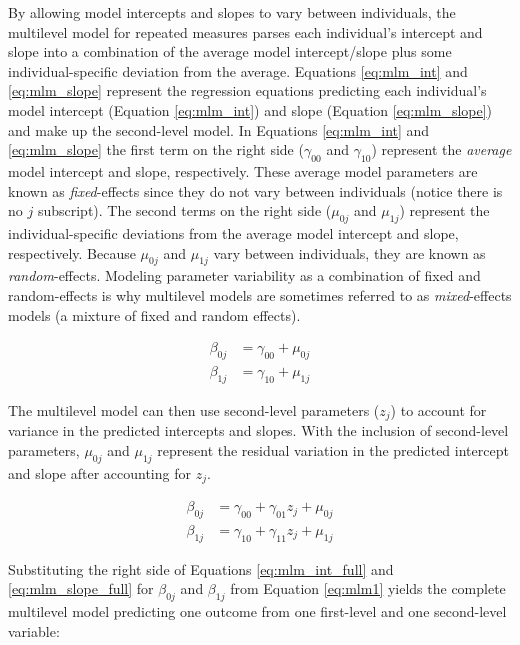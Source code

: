 \documentclass[
]{article}
\begin{document}
By allowing model intercepts and slopes to vary between individuals, the multilevel model for repeated measures parses each individual's intercept and slope into a combination of the average model intercept/slope plus some individual-specific deviation from the average. Equations \ref{eq:mlm_int} and \ref{eq:mlm_slope} represent the regression equations predicting each individual's model intercept (Equation \ref{eq:mlm_int}) and slope (Equation \ref{eq:mlm_slope}) and make up the second-level model. In Equations \ref{eq:mlm_int} and \ref{eq:mlm_slope} the first term on the right side (\(\gamma_{00}\) and \(\gamma_{10}\)) represent the \emph{average} model intercept and slope, respectively. These average model parameters are known as \emph{fixed}-effects since they do not vary between individuals (notice there is no \(j\) subscript). The second terms on the right side (\(\mu_{0j}\) and \(\mu_{1j}\)) represent the individual-specific deviations from the average model intercept and slope, respectively. Because \(\mu_{0j}\) and \(\mu_{1j}\) vary between individuals, they are known as \emph{random}-effects. Modeling parameter variability as a combination of fixed and random-effects is why multilevel models are sometimes referred to as \emph{mixed}-effects models (a mixture of fixed and random effects).

\begin{align}
\beta_{0j}&=\gamma_{00}+\mu_{0j}\label{eq:mlm_int}\\
\beta_{1j}&=\gamma_{10}+\mu_{1j}\label{eq:mlm_slope}
\end{align}

\noindent
The multilevel model can then use second-level parameters (\(z_{j}\)) to account for variance in the predicted intercepts and slopes. With the inclusion of second-level parameters, \(\mu_{0j}\) and \(\mu_{1j}\) represent the residual variation in the predicted intercept and slope after accounting for \(z_{j}\).

\begin{align}
\beta_{0j}&=\gamma_{00}+\gamma_{01}z_{j}+\mu_{0j}\label{eq:mlm_int_full}\\
\beta_{1j}&=\gamma_{10}+\gamma_{11}z_{j}+\mu_{1j}\label{eq:mlm_slope_full}
\end{align}

\noindent
Substituting the right side of Equations \ref{eq:mlm_int_full} and \ref{eq:mlm_slope_full} for \(\beta_{0j}\) and \(\beta_{1j}\) from Equation \ref{eq:mlm1} yields the complete multilevel model predicting one outcome from one first-level and one second-level variable:
\end{document}
